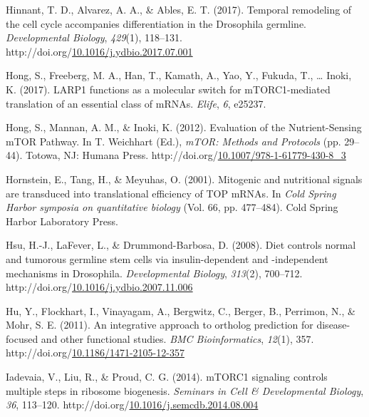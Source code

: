 \documentclass[12pt,oneside]{reedthesis}
\newlength{\cslhangindent}
\newenvironment{CSLReferences}[2] %
 {%
  \setlength{\parindent}{0pt}
  \ifodd #1 \everypar{\setlength{\hangindent}{\cslhangindent}}\ignorespaces\fi
  \ifnum #2 > 0
  \setlength{\parskip}{#2\baselineskip}
  \fi
 }%
 {}
\begin{document}
\begin{CSLReferences}{1}{0}
\leavevmode{}%
Hinnant, T. D., Alvarez, A. A., \& Ables, E. T. (2017). Temporal remodeling of the cell cycle accompanies differentiation in the {Drosophila} germline. \emph{Developmental Biology}, \emph{429}(1), 118--131. http://doi.org/\href{https://doi.org/10.1016/j.ydbio.2017.07.001}{10.1016/j.ydbio.2017.07.001}

\leavevmode{}%
Hong, S., Freeberg, M. A., Han, T., Kamath, A., Yao, Y., Fukuda, T., \ldots{} Inoki, K. (2017). {LARP1} functions as a molecular switch for {mTORC1}-mediated translation of an essential class of {mRNAs}. \emph{Elife}, \emph{6}, e25237.

\leavevmode{}%
Hong, S., Mannan, A. M., \& Inoki, K. (2012). Evaluation of the {Nutrient}-{Sensing mTOR Pathway}. In T. Weichhart (Ed.), \emph{{mTOR}: {Methods} and {Protocols}} (pp. 29--44). {Totowa, NJ}: {Humana Press}. http://doi.org/\href{https://doi.org/10.1007/978-1-61779-430-8_3}{10.1007/978-1-61779-430-8\_3}

\leavevmode{}%
Hornstein, E., Tang, H., \& Meyuhas, O. (2001). Mitogenic and nutritional signals are transduced into translational efficiency of {TOP mRNAs}. In \emph{Cold {Spring Harbor} symposia on quantitative biology} (Vol. 66, pp. 477--484). {Cold Spring Harbor Laboratory Press}.

\leavevmode{}%
Hsu, H.-J., LaFever, L., \& Drummond-Barbosa, D. (2008). Diet controls normal and tumorous germline stem cells via insulin-dependent and -independent mechanisms in {Drosophila}. \emph{Developmental Biology}, \emph{313}(2), 700--712. http://doi.org/\href{https://doi.org/10.1016/j.ydbio.2007.11.006}{10.1016/j.ydbio.2007.11.006}

\leavevmode{}%
Hu, Y., Flockhart, I., Vinayagam, A., Bergwitz, C., Berger, B., Perrimon, N., \& Mohr, S. E. (2011). An integrative approach to ortholog prediction for disease-focused and other functional studies. \emph{BMC Bioinformatics}, \emph{12}(1), 357. http://doi.org/\href{https://doi.org/10.1186/1471-2105-12-357}{10.1186/1471-2105-12-357}

\leavevmode{}%
Iadevaia, V., Liu, R., \& Proud, C. G. (2014). {mTORC1} signaling controls multiple steps in ribosome biogenesis. \emph{Seminars in Cell \& Developmental Biology}, \emph{36}, 113--120. http://doi.org/\href{https://doi.org/10.1016/j.semcdb.2014.08.004}{10.1016/j.semcdb.2014.08.004}


\end{CSLReferences}
\end{document}
